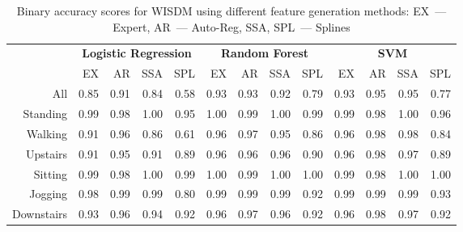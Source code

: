 \begin{table}[!h]
	\centering
	\caption{Binary accuracy scores for WISDM using different feature generation methods: EX~--- Expert, AR~--- Auto-Reg, SSA,  SPL~--- Splines}
	\tiny
	\begin{tabular}{|r|rrrr|rrrr|rrrr|}
		\hline
		& \multicolumn{4}{c|}{\textbf{Logistic Regression}} & \multicolumn{4}{c|}{\textbf{Random Forest}} & \multicolumn{4}{c|}{\textbf{SVM}}          \\ \cline{2-13} 
		& EX   & AR   & SSA   & SPL  & EX  & AR & SSA & SPL & EX & AR & SSA & SPL \\ \hline
		All& 0.85 & 0.91 & 0.84 & 0.58 & 0.93 & 0.93 & 0.92 & 0.79 & 0.93 & 0.95 & 0.95 & 0.77 \\
		Standing& 0.99 & 0.98 & 1.00 & 0.95 & 1.00 & 0.99 & 1.00 & 0.99 & 0.99 & 0.98 & 1.00 & 0.96 \\
		Walking& 0.91 & 0.96 & 0.86 & 0.61 & 0.96 & 0.97 & 0.95 & 0.86 & 0.96 & 0.98 & 0.98 & 0.84 \\
		Upstairs& 0.91 & 0.95 & 0.91 & 0.89 & 0.96 & 0.96 & 0.96 & 0.90 & 0.96 & 0.98 & 0.97 & 0.89 \\
		Sitting& 0.99 & 0.98 & 1.00 & 0.99 & 1.00 & 0.99 & 1.00 & 1.00 & 0.99 & 0.98 & 1.00 & 1.00 \\
		Jogging& 0.98 & 0.99 & 0.99 & 0.80 & 0.99 & 0.99 & 0.99 & 0.92 & 0.99 & 0.99 & 0.99 & 0.93 \\
		Downstairs& 0.93 & 0.96 & 0.94 & 0.92 & 0.96 & 0.97 & 0.96 & 0.92 & 0.96 & 0.98 & 0.97 & 0.92 \\ \hline
	\end{tabular}
	\label{tbl::wisdm_methods_results}
\end{table}

